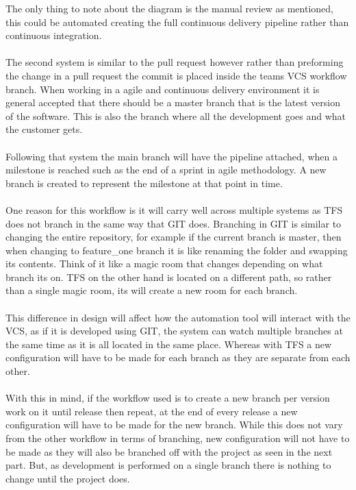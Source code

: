 The only thing to note about the diagram is the manual review as mentioned, this could be automated creating the full continuous delivery pipeline rather than continuous integration.
\\\\
The second system is similar to the pull request however rather than preforming the change in a pull request the commit is placed inside the teams VCS workflow branch. When working in a agile and continuous delivery environment it is general accepted that there should be a master branch that is the latest version of the software. This is also the branch where all the development goes and what the customer gets.
\\\\
Following that system the main branch will have the pipeline attached, when a milestone is reached such as the end of a sprint in agile methodology. A new branch is created to represent the milestone at that point in time. 
\\\\
One reason for this workflow is it will carry well across multiple systems as TFS does not branch in the same way that GIT does. Branching in GIT is similar to changing the entire repository, for example if the current branch is master, then when changing to feature\_one branch it is like renaming the folder and swapping its contents. Think of it like a magic room that changes depending on what branch its on. TFS on the other hand is located on a different path, so rather than a single magic room, its will create a new room for each branch.
\\\\
This difference in design will affect how the automation tool will interact with the VCS, as if it is developed using GIT, the system can watch multiple branches at the same time as it is all located in the same place. Whereas with TFS a new configuration will have to be made for each branch as they are separate from each other.
\\\\
With this in mind, if the workflow used is to create a new branch per version work on it until release then repeat, at the end of every release a new configuration will have to be made for the new branch. While this does not vary from the other workflow in terms of branching, new configuration will not have to be made as they will also be branched off with the project as seen in the next part. But, as development is performed on a single branch there is nothing to change until the project does.
